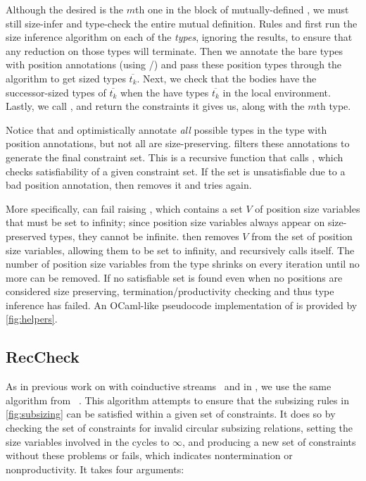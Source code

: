Although the desired \cofixpoint is the $m$th one in the block of mutually-defined \cofixpoints, we must still size-infer and type-check the entire mutual definition.
Rules  and  first run the size inference algorithm on each of the \cofixpoint \emph{types}, ignoring the results, to ensure that any reduction on those types will terminate.
Then we annotate the bare types with position annotations (using \setrecstars/\setcorecstars) and pass these position types through the algorithm to get sized types $\overline{t_k}$.
Next, we check that the \cofixpoint bodies have the successor-sized types of $\overline{t_k}$ when the \cofixpoints have types $\overline{t_k}$ in the local environment.
Lastly, we call \RecCheckLoop, and return the constraints it gives us, along with the $m$th \cofixpoint type.



Notice that \setrecstars and \setcorecstars optimistically annotate \textit{all} possible \coinductive types in the \cofixpoint type with position annotations, but not all \cofixpoints are size-preserving.
\RecCheckLoop filters these annotations to generate the final constraint set.
This is a recursive function that calls \RecCheck, which checks satisfiability of a given constraint set.
If the set is unsatisfiable due to a bad position annotation, then \RecCheckLoop removes it and tries again.

More specifically, \RecCheck can fail raising \RecCheckFail, which contains a set $V$ of position size variables that must be set to infinity; since position size variables always appear on size-preserved types, they cannot be infinite.
\RecCheckLoop then removes $V$ from the set of position size variables, allowing them to be set to infinity, and recursively calls itself.
The number of position size variables from the \cofixpoint type shrinks on every iteration until no more can be removed.
If no satisfiable set is found even when no positions are considered size preserving, termination/productivity checking and thus type inference has failed.
An OCaml-like pseudocode implementation of \RecCheckLoop is provided by \autoref{fig:helpers}.

\subsection{RecCheck}

As in previous work on \CChatomega with coinductive streams~\cite{cc-hat-omega} and in \CIChat, we use the same \RecCheck algorithm from \Fhat~\cite{f-hat}.
This algorithm attempts to ensure that the subsizing rules in \autoref{fig:subsizing} can be satisfied within a given set of constraints.
It does so by checking the set of constraints for invalid circular subsizing relations, setting the size variables involved in the cycles to $\infty$, and producing a new set of constraints without these problems or fails, which indicates nontermination or nonproductivity.
It takes four arguments:

